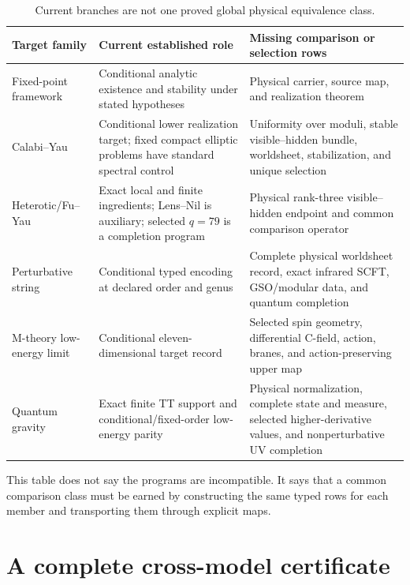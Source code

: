 \documentclass[11pt]{article}
\theoremstyle{definition}
\theoremstyle{remark}
\newcommand{\1}{\mathbf 1}
\begin{document}
\begin{table}[htbp]
\centering
\small
\begin{tabularx}{\textwidth}{L{0.20\textwidth}L{0.25\textwidth}Y}
\toprule
Target family & Current established role & Missing comparison or selection rows \\
\midrule
Fixed-point framework
& Conditional analytic existence and stability under stated hypotheses
& Physical carrier, source map, and realization theorem
  \cite{MTTFixedPointsI2026} \\
Calabi--Yau
& Conditional lower realization target; fixed compact elliptic problems have standard spectral control
& Uniformity over moduli, stable visible--hidden bundle, worldsheet, stabilization, and unique selection
  \cite{MTTCalabiYau2026} \\
Heterotic/Fu--Yau
& Exact local and finite ingredients; Lens--Nil is auxiliary; selected \(q=79\) is a completion program
& Physical rank-three visible--hidden endpoint and common comparison operator
  \cite{MTTHeteroticFlux2026,MTTHeteroticSelection2026} \\
Perturbative string
& Conditional typed encoding at declared order and genus
& Complete physical worldsheet record, exact infrared SCFT, GSO/modular data, and quantum completion
  \cite{MTTPerturbativeString2026} \\
M-theory low-energy limit
& Conditional eleven-dimensional target record
& Selected spin geometry, differential C-field, action, branes, and action-preserving upper map
  \cite{MTTMTheory2026} \\
Quantum gravity
& Exact finite TT support and conditional/fixed-order low-energy parity
& Physical normalization, complete state and measure, selected higher-derivative values, and nonperturbative UV completion
  \cite{MTTQuantumGravity2026} \\
\bottomrule
\end{tabularx}
\caption{Current branches are not one proved global physical equivalence class.}
\label{tab:applications}
\end{table}

This table does not say the programs are incompatible.  It says that a
common comparison class must be earned by constructing the same typed rows
for each member and transporting them through explicit maps.

\section{A complete cross-model certificate}
\label{sec:certificate}
\end{document}
